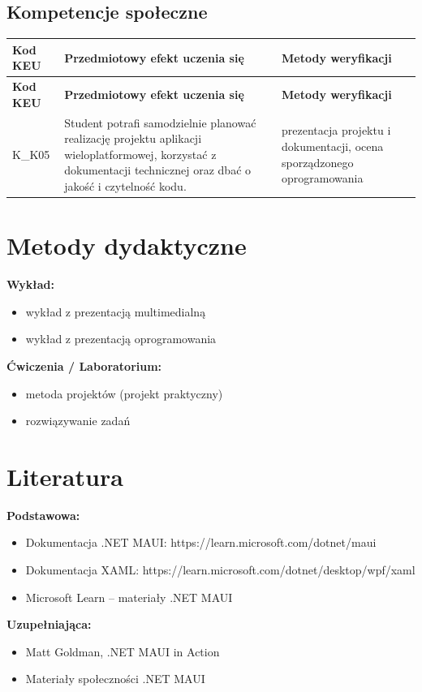 \documentclass[12pt, a4paper]{article}
\newcommand{\thdrule}{\noalign{\global\setlength{\extrarowheight}{0pt}}}
\newcommand{\thdend}{\noalign{\global\setlength{\extrarowheight}{3pt}}}
\begin{document}
\subsection*{Kompetencje społeczne}
{\scriptsize
\begin{longtable}{m{1.6cm}m{9.0cm}m{4.2cm}}
\thdrule\toprule
\rowcolor{pjatkRed} {\color{white}\footnotesize\textbf{\vphantom{Ag}Kod KEU}} & {\color{white}\footnotesize\textbf{\vphantom{Ag}Przedmiotowy efekt uczenia się}} & {\color{white}\footnotesize\textbf{\vphantom{Ag}Metody weryfikacji}} \\
\midrule\thdend
\endfirsthead
\thdrule\toprule
\rowcolor{pjatkRed} {\color{white}\footnotesize\textbf{\vphantom{Ag}Kod KEU}} & {\color{white}\footnotesize\textbf{\vphantom{Ag}Przedmiotowy efekt uczenia się}} & {\color{white}\footnotesize\textbf{\vphantom{Ag}Metody weryfikacji}} \\
\midrule\thdend
\endhead
  \rowcolor{tableRowLight} K\_K05 & Student potrafi samodzielnie planować realizację projektu aplikacji wieloplatformowej, korzystać z dokumentacji technicznej oraz dbać o jakość i czytelność kodu. & prezentacja projektu i dokumentacji, ocena sporządzonego oprogramowania \\
\bottomrule
\end{longtable}}

\section{Metody dydaktyczne}

\textbf{Wykład:}
\begin{itemize}
  \item wykład z prezentacją multimedialną
  \item wykład z prezentacją oprogramowania
\end{itemize}
\vspace{4pt}
\textbf{Ćwiczenia / Laboratorium:}
\begin{itemize}
  \item metoda projektów (projekt praktyczny)
  \item rozwiązywanie zadań
\end{itemize}
\vspace{4pt}


\section{Literatura}

\textbf{Podstawowa:}
\begin{itemize}
  \item Dokumentacja .NET MAUI: https://learn.microsoft.com/dotnet/maui
  \item Dokumentacja XAML: https://learn.microsoft.com/dotnet/desktop/wpf/xaml
  \item Microsoft Learn – materiały .NET MAUI
\end{itemize}

\textbf{Uzupełniająca:}
\begin{itemize}
  \item Matt Goldman, .NET MAUI in Action
  \item Materiały społeczności .NET MAUI
\end{itemize}
\end{document}
